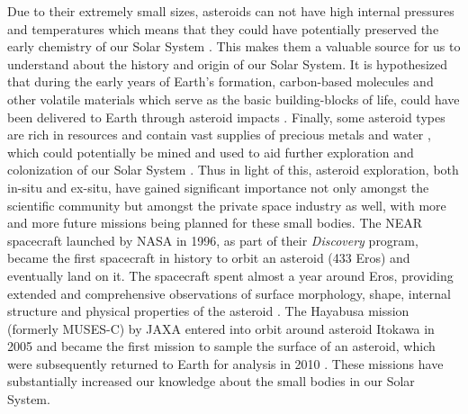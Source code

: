 Due to their extremely small sizes, asteroids can not have high internal pressures and temperatures which means that they could have potentially preserved the early chemistry of our Solar System \parencite{hayabusaTouchdownDynamics}. This makes them a valuable source for us to understand about the history and origin of our Solar System. It is hypothesized that during the early years of Earth's formation, carbon-based molecules and other volatile materials which serve as the basic building-blocks of life, could have been delivered to Earth through asteroid impacts \parencite{jpl_asteroid_web}. Finally, some asteroid types are rich in resources and contain vast supplies of precious metals \parencite{asteroidPreciousMetalSource} and water \parencite{asteroidWaterSource}, which could potentially be mined and used to aid further exploration and colonization of our Solar System \parencite{jpl_asteroid_web}. Thus in light of this, asteroid exploration, both in-situ and ex-situ, have gained significant importance not only amongst the scientific community but amongst the private space industry as well, with more and more future missions being planned for these small bodies. The \gls{NEAR} spacecraft launched by \gls{NASA} in 1996, as part of their \textit{Discovery} program, became the first spacecraft in history to orbit an asteroid (433 Eros) and eventually land on it. The spacecraft spent almost a year around Eros, providing extended and comprehensive observations of surface morphology, shape, internal structure and physical properties of the asteroid \parencite{nearMission}. The Hayabusa mission (formerly MUSES-C) by \gls{JAXA} entered into orbit around asteroid Itokawa in 2005 and became the first mission to sample the surface of an asteroid, which were subsequently returned to Earth for analysis in 2010 \parencite{yanoHayabusaTouchdown}. These missions have substantially increased our knowledge about the small bodies in our Solar System.
%
\newline\newline
%
